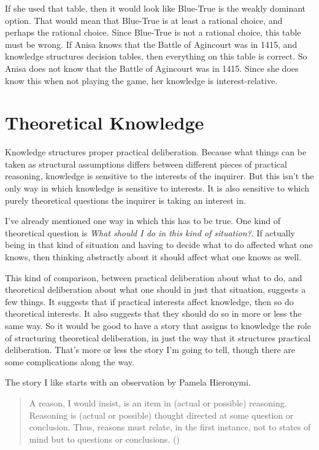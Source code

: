 \documentclass[
  10pt,
  letterpaper,
  twoside]{scrbook}
\begin{document}
If she used that table, then it would look like Blue-True is the weakly
dominant option. That would mean that Blue-True is at least a rational
choice, and perhaps the rational choice. Since Blue-True is not a
rational choice, this table must be wrong. If Anisa knows that the
Battle of Agincourt was in 1415, and knowledge structures decision
tables, then everything on this table is correct. So Anisa does not know
that the Battle of Agincourt was in 1415. Since she does know this when
not playing the game, her knowledge is interest-relative.

\section{Theoretical Knowledge}\label{sec-theoreticalknowledge}

Knowledge structures proper practical deliberation. Because what things
can be taken as structural assumptions differs between different pieces
of practical reasoning, knowledge is sensitive to the interests of the
inquirer. But this isn't the only way in which knowledge is sensitive to
interests. It is also sensitive to which purely theoretical questions
the inquirer is taking an interest in.

I've already mentioned one way in which this has to be true. One kind of
theoretical question is \emph{What should I do in this kind of
situation?}. If actually being in that kind of situation and having to
decide what to do affected what one knows, then thinking abstractly
about it should affect what one knows as well.

This kind of comparison, between practical deliberation about what to
do, and theoretical deliberation about what one should in just that
situation, suggests a few things. It suggests that if practical
interests affect knowledge, then so do theoretical interests. It also
suggests that they should do so in more or less the same way. So it
would be good to have a story that assigns to knowledge the role of
structuring theoretical deliberation, in just the way that it structures
practical deliberation. That's more or less the story I'm going to tell,
though there are some complications along the way.

The story I like starts with an observation by Pamela Hieronymi.

\begin{quote}
A reason, I would insist, is an item in (actual or possible) reasoning.
Reasoning is (actual or possible) thought directed at some question or
conclusion. Thus, reasons must relate, in the first instance, not to
states of mind but to questions or conclusions.
()
\end{quote}
\end{document}
